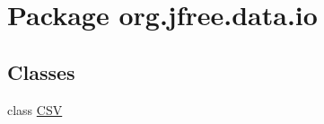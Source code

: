 \hypertarget{namespaceorg_1_1jfree_1_1data_1_1io}{}\section{Package org.\+jfree.\+data.\+io}
\label{namespaceorg_1_1jfree_1_1data_1_1io}
\subsection*{Classes}
\begin{DoxyCompactItemize}
\item 
class \mbox{\hyperlink{classorg_1_1jfree_1_1data_1_1io_1_1_c_s_v}{C\+SV}}
\end{DoxyCompactItemize}
